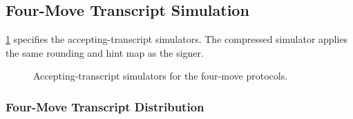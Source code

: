 \subsection{Four-Move Transcript Simulation}

\cref{fig:four-simulator} specifies the accepting-transcript simulators. The compressed simulator applies the same rounding and hint map as the signer.

\begin{figure}[!htbp]
\centering
\begin{minipage}[t]{.44\linewidth}
\centering
{}
\end{minipage}\hfill
\begin{minipage}[t]{.54\linewidth}
\centering
{}
\end{minipage}
\caption{Accepting-transcript simulators for the four-move protocols.}
\label{fig:four-simulator}
\end{figure}

\subsubsection{Four-Move Transcript Distribution}

